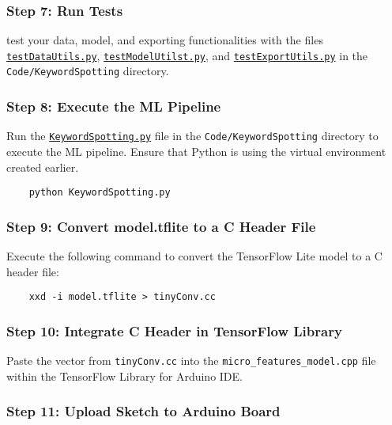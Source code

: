 \subsubsection{Step 7: Run Tests}

test your data, model, and exporting functionalities with the files \href{run:../Code/KeywordSpotting/testDataUtils.py}{\texttt{testDataUtils.py}}, \href{run:../Code/KeywordSpotting/testModelUtilst.py}{\texttt{testModelUtilst.py}}, and \href{run:../Code/KeywordSpotting/testExportUtils.py}{\texttt{testExportUtils.py}} in the \texttt{Code/KeywordSpotting} directory.


\subsubsection{Step 8: Execute the ML Pipeline}

Run the \href{run:../Code/KeywordSpotting/KeywordSpotting.py}{\texttt{KeywordSpotting.py}} file in the \texttt{Code/KeywordSpotting} directory to execute the ML pipeline. Ensure that Python is using the virtual environment created earlier.

\begin{verbatim}
	python KeywordSpotting.py
\end{verbatim}

\subsubsection{Step 9: Convert model.tflite to a C Header File}

Execute the following command to convert the TensorFlow Lite model to a C header file:

\begin{verbatim}
	xxd -i model.tflite > tinyConv.cc
\end{verbatim}

\subsubsection{Step 10: Integrate C Header in TensorFlow Library}

Paste the vector from \texttt{tinyConv.cc} into the \texttt{micro\_features\_model.cpp} file within the TensorFlow Library for Arduino IDE.

\subsubsection{Step 11: Upload Sketch to Arduino Board}

